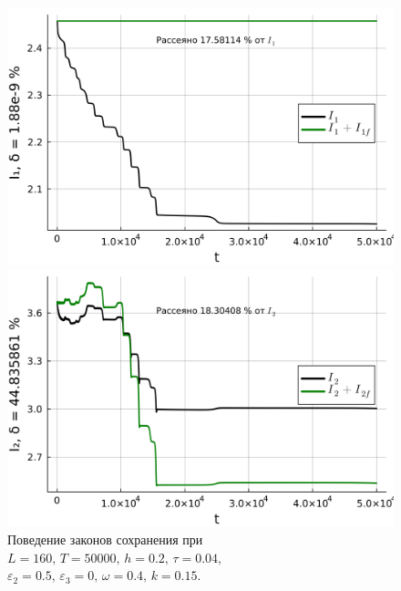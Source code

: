 \documentclass[14pt,a4paper]{extreport}
\begin{document}
			\begin{figure}[H] %
				\begin{center}
					\begin{minipage}[h]{0.48\linewidth}
						\includegraphics[width=1\linewidth]{fig74.png}
					\end{minipage}
					\hfill
					\begin{minipage}[h]{0.48\linewidth}
						\includegraphics[width=1\linewidth]{fig75.png}
					\end{minipage}
				\end{center}
				\caption{Поведение законов сохранения при
				\(L=160,\, T=50000,\, h=0.2,\, \tau=0.04,\)
				\(\varepsilon_{2}=0.5,\,\varepsilon_{3}=0,\, \omega=0.4,\, k=0.15\).}
				\label{fig340-5_2}
			\end{figure}
\end{document}
